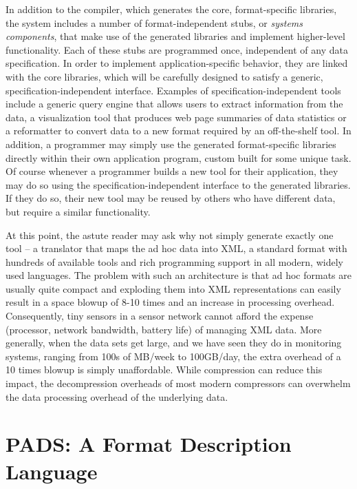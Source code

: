 \documentclass{sigplanconf}
\begin{document}
In addition to the compiler, which generates the core, format-specific
libraries, the system includes a number of format-independent stubs,
or {\em systems components},
that make use of the generated libraries and implement higher-level
functionality.  Each of these stubs are programmed once, independent
of any data specification.  
In order to implement application-specific behavior, they
are linked with the core libraries, which will be carefully designed to
satisfy a generic, specification-independent interface.  Examples of
specification-independent tools include a generic query engine that
allows users to extract information from the data, 
a visualization tool that produces
web page summaries of data statistics or a reformatter to convert data
to a new format required by an off-the-shelf tool.  In addition,
a programmer may simply use the generated format-specific libraries directly 
within their own application program, custom built for some unique task. 
Of course whenever a programmer builds a new tool for their application, 
they may do so using the specification-independent interface to the generated
libraries.  If they do so, their new tool may be reused by others
who have different data, but require a similar functionality.

At this point, the astute reader may ask why not simply generate
exactly one tool -- a translator that maps the ad hoc data into
XML, a standard format with hundreds of available tools and
rich programming support in all modern, widely used languages.
The problem with such an architecture is that ad hoc formats
are usually quite compact and exploding them into XML representations
can easily result in a space blowup of 8-10 times and an increase
in processing overhead.  Consequently, tiny
sensors in a sensor network cannot afford the expense (processor,
network bandwidth, battery life) of managing
XML data.  More generally, when the data sets get large, and we 
have seen they do in monitoring systems, 
ranging from 100s of MB/week to 100GB/day,
the extra overhead of a 10 times blowup is simply unaffordable.
While compression can reduce this impact, the decompression overheads
of most modern compressors can overwhelm the data processing overhead
of the underlying data.

\section{PADS:  A Format Description Language}
\label{sec:pads}
\end{document}
